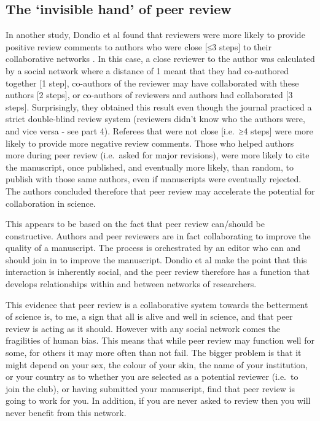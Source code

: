 \documentclass[
]{krantz}
\begin{document}
\hypertarget{the-invisible-hand-of-peer-review}{%
\subsection{The `invisible hand' of peer review}\label{the-invisible-hand-of-peer-review}}

In another study, Dondio et al \citeyearpar{dondio2019invisible} found that reviewers were more likely to provide positive review comments to authors who were close {[}≤3 steps{]} to their collaborative networks \citep[see][]{adams2012rise}. In this case, a close reviewer to the author was calculated by a social network where a distance of 1 meant that they had co-authored together {[}1 step{]}, co-authors of the reviewer may have collaborated with these authors {[}2 steps{]}, or co-authors of reviewers and authors had collaborated {[}3 steps{]}. Surprisingly, they obtained this result even though the journal practiced a strict double-blind review system (reviewers didn't know who the authors were, and vice versa - see part 4). Referees that were not close {[}i.e.~≥4 steps{]} were more likely to provide more negative review comments. Those who helped authors more during peer review (i.e.~asked for major revisions), were more likely to cite the manuscript, once published, and eventually more likely, than random, to publish with those same authors, even if manuscripts were eventually rejected. The authors concluded therefore that peer review may accelerate the potential for collaboration in science.

This appears to be based on the fact that peer review can/should be constructive. Authors and peer reviewers are in fact collaborating to improve the quality of a manuscript. The process is orchestrated by an editor who can and should join in to improve the manuscript. Dondio et al \citeyearpar{dondio2019invisible} make the point that this interaction is inherently social, and the peer review therefore has a function that develops relationships within and between networks of researchers.

This evidence that peer review is a collaborative system towards the betterment of science is, to me, a sign that all is alive and well in science, and that peer review is acting as it should. However with any social network comes the fragilities of human bias. This means that while peer review may function well for some, for others it may more often than not fail. The bigger problem is that it might depend on your sex, the colour of your skin, the name of your institution, or your country as to whether you are selected as a potential reviewer (i.e.~to join the club), or having submitted your manuscript, find that peer review is going to work for you. In addition, if you are never asked to review then you will never benefit from this network.
\end{document}
